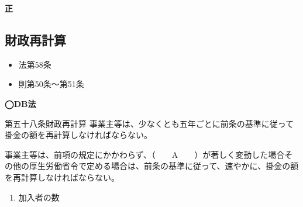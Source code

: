 \begin{answerbox}
  \textbf{正}
\end{answerbox}

\newpage

\subsection{財政再計算}

\begin{InyouJobunbox}
  \begin{itemize}
    \item 法第58条
    \item 則第50条〜第51条
  \end{itemize}
\end{InyouJobunbox}

\begin{fillblank}[数理人試験 H26 問題1(3)h]
  \noindent \textbf{◯DB法}
  \begin{lawstructure}
    \begin{lawarticle}{第五十八条}{財政再計算}
      事業主等は、少なくとも五年ごとに前条の基準に従って掛金の額を再計算しなければならない。

      事業主等は、前項の規定にかかわらず、（　　A　　）が著しく変動した場合その他の厚生労働省令で定める場合は、前条の基準に従って、速やかに、掛金の額を再計算しなければならない。
    \end{lawarticle}
  \end{lawstructure}
\end{fillblank}

\begin{answerbox}
  \begin{enumerate}[A: ]
    \item 加入者の数
  \end{enumerate}
\end{answerbox}

